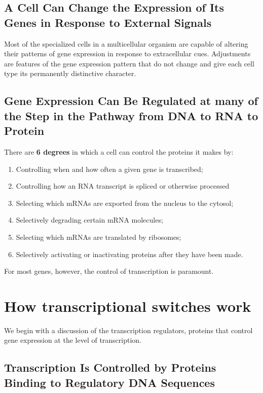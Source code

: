 \subsection{A Cell Can Change the Expression of Its Genes in Response to External Signals}

Most of the specialized cells in a multicellular organism are capable of
altering their patterns of gene expression in response to extracellular
cues. Adjustments are features of the gene expression pattern
that do not change and give each cell type its permanently distinctive
character.

\subsection{Gene Expression Can Be Regulated at many of the Step in the Pathway from DNA to RNA to Protein}

There are \textbf{6 degrees} in which a cell can control the proteins it makes by:
\begin{enumerate}
\item Controlling when and how often a given gene is transcribed;
\item Controlling how an RNA transcript is spliced or otherwise processed
\item Selecting which mRNAs are exported from the nucleus to the cytosol;
\item Selectively degrading certain mRNA molecules;
\item Selecting which mRNAs are translated by ribosomes;
\item Selectively activating or inactivating proteins after they have been made.
\end{enumerate}

For most genes, however, the control of transcription is paramount.

\section{How transcriptional switches work}

We begin with a discussion of the transcription regulators,
proteins that control gene expression at the level of transcription.

\subsection{Transcription Is Controlled by Proteins Binding to Regulatory DNA Sequences}

